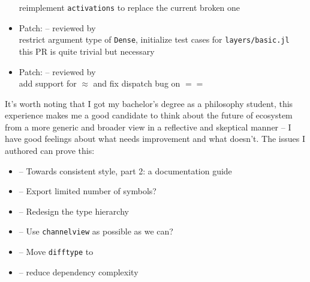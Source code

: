 \begin{itemize}
      {\small
      reimplement \texttt{activations} to replace the current broken one
      }
    \item Patch:  {\small -- reviewed by \mikeinnes}\\
      {\small
      restrict argument type of \texttt{Dense}, initialize test cases for \texttt{layers/basic.jl}\\
      this PR is quite trivial but necessary
      }
    \item Patch:  {\small -- reviewed by \mikeinnes}\\
      {\small
      add support for \textsf{$\approx$} and fix dispatch bug on \textsf{$==$}
      }
\end{itemize}
It's worth noting that I got my bachelor's degree as a philosophy student, this experience makes me a good candidate to think about the future of \images{} ecosystem from a more generic and broader view in a reflective and skeptical manner -- I have good feelings about what needs improvement and what doesn't. The issues I authored can prove this:
\begin{itemize}
  \item {} -- Towards consistent style, part 2: a documentation guide
  \item {} -- Export limited number of symbols?
  \item {} -- Redesign the type hierarchy
  \item {} -- Use \texttt{channelview} as possible as we can?
  \item {} -- Move \texttt{difftype} to \imagecore
  \item {} -- reduce \images{} dependency complexity
\end{itemize}

